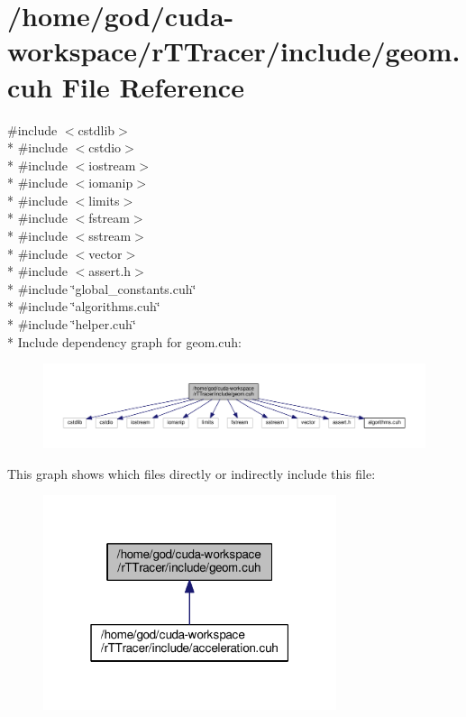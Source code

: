 \hypertarget{geom_8cuh}{}\section{/home/god/cuda-\/workspace/r\+T\+Tracer/include/geom.cuh File Reference}
\label{geom_8cuh}
{\ttfamily \#include $<$cstdlib$>$}\\*
{\ttfamily \#include $<$cstdio$>$}\\*
{\ttfamily \#include $<$iostream$>$}\\*
{\ttfamily \#include $<$iomanip$>$}\\*
{\ttfamily \#include $<$limits$>$}\\*
{\ttfamily \#include $<$fstream$>$}\\*
{\ttfamily \#include $<$sstream$>$}\\*
{\ttfamily \#include $<$vector$>$}\\*
{\ttfamily \#include $<$assert.\+h$>$}\\*
{\ttfamily \#include \char`\"{}global\+\_\+constants.\+cuh\char`\"{}}\\*
{\ttfamily \#include \char`\"{}algorithms.\+cuh\char`\"{}}\\*
{\ttfamily \#include \char`\"{}helper.\+cuh\char`\"{}}\\*
Include dependency graph for geom.\+cuh\+:
\nopagebreak
\begin{figure}[H]
\begin{center}
\leavevmode
\includegraphics[width=350pt]{geom_8cuh__incl}
\end{center}
\end{figure}
This graph shows which files directly or indirectly include this file\+:
\nopagebreak
\begin{figure}[H]
\begin{center}
\leavevmode
\includegraphics[width=244pt]{geom_8cuh__dep__incl}
\end{center}
\end{figure}
